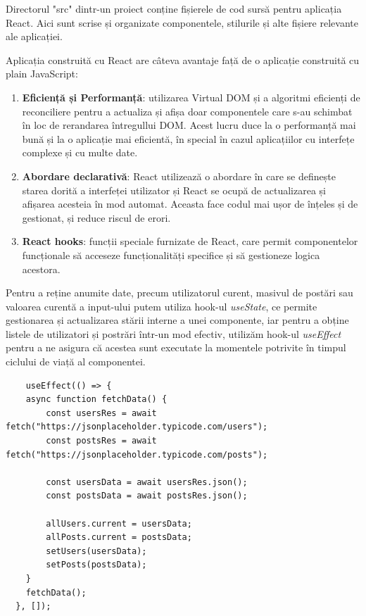 \documentclass[12pt, a4paper]{report}
\begin{document}
Directorul "src" dintr-un proiect conține fișierele de cod sursă pentru aplicația React. Aici sunt scrise și organizate componentele, stilurile și alte fișiere relevante ale aplicației.

Aplicația construită cu React are câteva avantaje față de o aplicație construită cu plain JavaScript:

\begin{enumerate}
	\item \textbf{Eficiență și Performanță}: utilizarea Virtual DOM și a algoritmi eficienți de reconciliere pentru a actualiza și afișa doar componentele care s-au schimbat în loc de rerandarea întregullui DOM. Acest lucru duce la o performanță mai bună și la o aplicație mai eficientă, în special în cazul aplicațiilor cu interfețe complexe și cu multe date.
	\item \textbf{Abordare declarativă}: React utilizează o abordare în care se definește starea dorită a interfeței utilizator și React se ocupă de actualizarea și afișarea acesteia în mod automat. Aceasta face codul mai ușor de înțeles și de gestionat, și reduce riscul de erori.
	\item \textbf{React hooks}:  funcții speciale furnizate de React, care permit componentelor funcționale să acceseze funcționalități specifice și să gestioneze logica acestora.
\end{enumerate}

Pentru a reține anumite date, precum utilizatorul curent, masivul de postări sau valoarea curentă a input-ului putem utiliza hook-ul \emph{useState}, ce permite gestionarea și actualizarea stării interne a unei componente, iar pentru a obține listele de utilizatori și postrări într-un mod efectiv, utilizăm hook-ul \emph{useEffect} pentru a ne asigura că acestea sunt executate la momentele potrivite în timpul ciclului de viață al componentei.

\begin{lstlisting}
	useEffect(() => {
    async function fetchData() {
    	const usersRes = await fetch("https://jsonplaceholder.typicode.com/users");
    	const postsRes = await fetch("https://jsonplaceholder.typicode.com/posts");
      
		const usersData = await usersRes.json();
    	const postsData = await postsRes.json();

    	allUsers.current = usersData;
    	allPosts.current = postsData;
    	setUsers(usersData);
    	setPosts(postsData);
    }
    fetchData();
  }, []);
\end{lstlisting}
\end{document}
